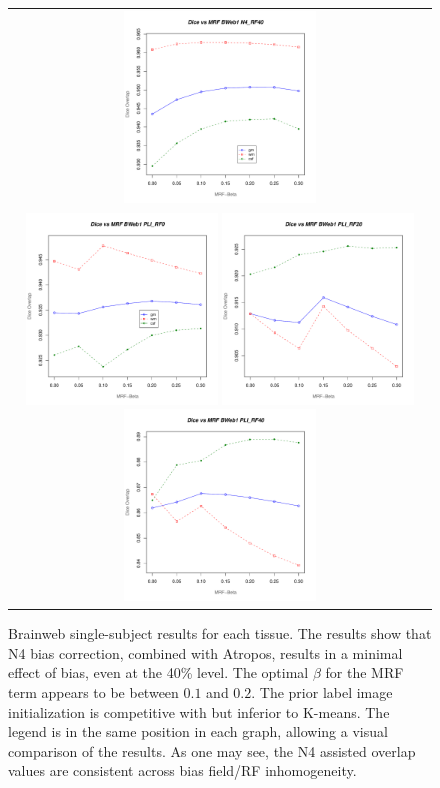 \documentclass[11pt,english]{article}
\begin{document}
\begin{figure}
\begin{center}
\begin{tabular}{c}
\includegraphics[height=2in]{Figures/tissue_dice_vs_mrf_N4_RF40.pdf}\\
\includegraphics[height=2in]{Figures/tissue_dice_vs_mrf_PLI_RF0.pdf}
\includegraphics[height=2in]{Figures/tissue_dice_vs_mrf_PLI_RF20.pdf}
\includegraphics[height=2in]{Figures/tissue_dice_vs_mrf_PLI_RF40.pdf}
\end{tabular}
\caption{\baselineskip 12pt \small Brainweb single-subject results for
  each tissue.  The results show that N4 bias correction, combined with Atropos, results in a minimal effect of
  bias, even at the 40\% level.  The optimal $\beta$ for the MRF term
  appears to be between $0.1$ and $0.2$.  The prior label image
  initialization is competitive with but inferior to K-means.  The
  legend is in the same position in each graph, allowing a visual
  comparison of the results.  As one may see, the N4 assisted overlap
  values are consistent across bias field/RF inhomogeneity.}
\label{fig:bweb1}
\end{center}
\end{figure}
\end{document}
